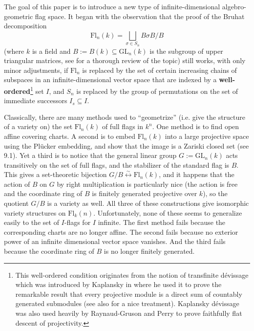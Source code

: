 \documentclass[oneside,11pt]{amsart}
\newcommand{\GL}{\ensuremath{\text{GL}}}
\newcommand{\Fl}{\ensuremath{\text{Fl}}}
\theoremstyle{definition}
\newtheorem{proof techniques}{Proof Techniques}
\begin{document}
The goal of this paper is to introduce a new type of infinite-dimensional algebro-geometric flag space. It began with the observation that the proof of the Bruhat decomposition
\begin{equation*}
\Fl_n(k) = \bigsqcup_{\sigma \in S_n} B \sigma B / B
\end{equation*}
(where $k$ is a field and $B := B(k) \subseteq \GL_n(k)$ is the subgroup of upper triangular matrices, see \cite{lusztig2010} for a thorough review of the topic) still works, with only minor adjustments, if $\Fl_n$ is replaced by the set of certain increasing chains of subspaces in an infinite-dimensional vector space that are indexed by a \textbf{well-ordered}\footnote{This well-ordered condition originates from the notion of transfinite d\'{e}vissage which was introduced by Kaplansky in \cite{kaplansky1958} where he used it to prove the remarkable result that every projective module is a direct sum of countably generated submodules (see also \cite[{058T}]{stacks-project} for a nice treatment). Kaplansky d\'{e}vissage was also used heavily by Raynaud-Gruson \cite{raynaud-gruson1971} and Perry \cite{perry2010} to prove faithfully flat descent of projectivity.} set $I$, and $S_n$ is replaced by the group of permutations on the set of immediate successors $I_s \subseteq I$.

Classically, there are many methods used to ``geometrize'' (i.e. give the structure of a variety on) the set $\text{Fl}_n(k)$ of full flags in $k^n$. One method is to find open affine covering charts. A second is to embed $\text{Fl}_n(k)$ into a large projective space using the Pl\"{u}cker embedding, and show that the image is a Zariski closed set (see \cite{fulton1997} 9.1). Yet a third is to notice that the general linear group $G := \GL_n(k)$ acts transitively on the set of full flags, and the stabilizer of the standard flag is $B$. This gives a set-theoretic bijection $G / B \overset{\sim}{\leftrightarrow} \Fl_n(k)$, and it happens that the action of $B$ on $G$ by right multiplication is particularly nice (the action is free and the coordinate ring of $B$ is finitely generated projective over $k$), so the quotient $G / B$ is a variety as well. All three of these constructions give isomorphic variety structures on $\text{Fl}_k(n)$. Unfortunately, none of these seems to generalize easily to the set of $I$-flags for $I$ infinite. The first method fails because the corresponding charts are no longer affine. The second fails because no exterior power of an infinite dimensional vector space vanishes. And the third fails because the coordinate ring of $B$ is no longer finitely generated. 
\end{document}
